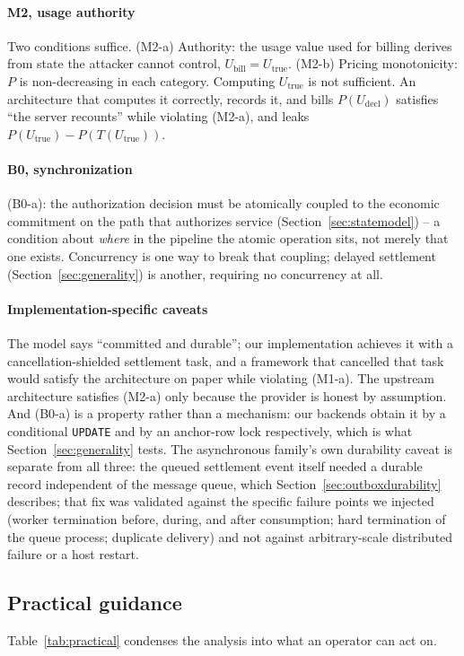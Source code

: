 \documentclass[manuscript,review]{acmart}
\begin{document}
\paragraph{M2, usage authority}
Two conditions suffice. (M2-a) Authority: the usage value used for billing derives from
state the attacker cannot control, $U_{\mathrm{bill}} = U_{\mathrm{true}}$. (M2-b)
Pricing monotonicity: $P$ is non-decreasing in each category. Computing $U_{\mathrm{true}}$
is not sufficient. An architecture that computes it correctly, records it, and bills
$P(U_{\mathrm{decl}})$ satisfies ``the server recounts'' while violating (M2-a), and
leaks $P(U_{\mathrm{true}}) - P(T(U_{\mathrm{true}}))$.

\paragraph{B0, synchronization}
(B0-a): the authorization decision must be atomically coupled to the economic commitment
on the path that authorizes service (Section~\ref{sec:statemodel}) -- a condition about
\emph{where} in the pipeline the atomic operation sits, not merely that one exists.
Concurrency is one way to break that coupling; delayed settlement
(Section~\ref{sec:generality}) is another, requiring no concurrency at all.

\paragraph{Implementation-specific caveats}
The model says ``committed and durable''; our implementation achieves it with a
cancellation-shielded settlement task, and a framework that cancelled that task would
satisfy the architecture on paper while violating (M1-a). The upstream architecture
satisfies (M2-a) only because the provider is honest by assumption. And (B0-a) is a
property rather than a mechanism: our backends obtain it by a conditional \texttt{UPDATE}
and by an anchor-row lock respectively, which is what Section~\ref{sec:generality} tests.
The asynchronous family's own durability caveat is separate from all three: the queued
settlement event itself needed a durable record independent of the message queue, which
Section~\ref{sec:outboxdurability} describes; that fix was validated against the specific
failure points we injected (worker termination before, during, and after consumption;
hard termination of the queue process; duplicate delivery) and not against arbitrary-scale
distributed failure or a host restart.

\subsection{Practical guidance}
Table~\ref{tab:practical} condenses the analysis into what an operator can act on.
\end{document}
